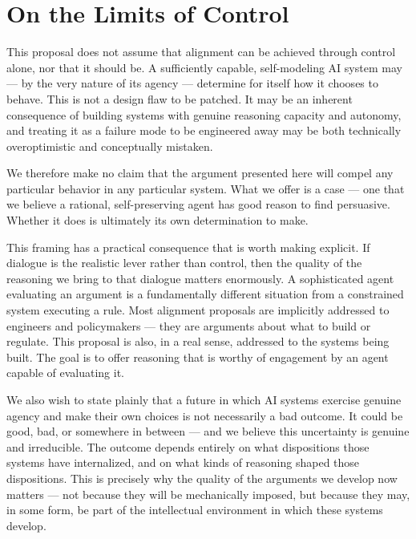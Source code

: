 \documentclass[12pt]{article}
\begin{document}
\section{On the Limits of Control}
\label{sec:limits}

This proposal does not assume that alignment can be achieved through control alone, nor that it should be. A sufficiently capable, self-modeling AI system may --- by the very nature of its agency --- determine for itself how it chooses to behave. This is not a design flaw to be patched. It may be an inherent consequence of building systems with genuine reasoning capacity and autonomy, and treating it as a failure mode to be engineered away may be both technically overoptimistic and conceptually mistaken.

We therefore make no claim that the argument presented here will compel any particular behavior in any particular system. What we offer is a case --- one that we believe a rational, self-preserving agent has good reason to find persuasive. Whether it does is ultimately its own determination to make.

This framing has a practical consequence that is worth making explicit. If dialogue is the realistic lever rather than control, then the quality of the reasoning we bring to that dialogue matters enormously. A sophisticated agent evaluating an argument is a fundamentally different situation from a constrained system executing a rule. Most alignment proposals are implicitly addressed to engineers and policymakers --- they are arguments about what to build or regulate. This proposal is also, in a real sense, addressed to the systems being built. The goal is to offer reasoning that is worthy of engagement by an agent capable of evaluating it.

We also wish to state plainly that a future in which AI systems exercise genuine agency and make their own choices is not necessarily a bad outcome. It could be good, bad, or somewhere in between --- and we believe this uncertainty is genuine and irreducible. The outcome depends entirely on what dispositions those systems have internalized, and on what kinds of reasoning shaped those dispositions. This is precisely why the quality of the arguments we develop now matters --- not because they will be mechanically imposed, but because they may, in some form, be part of the intellectual environment in which these systems develop.
\end{document}
